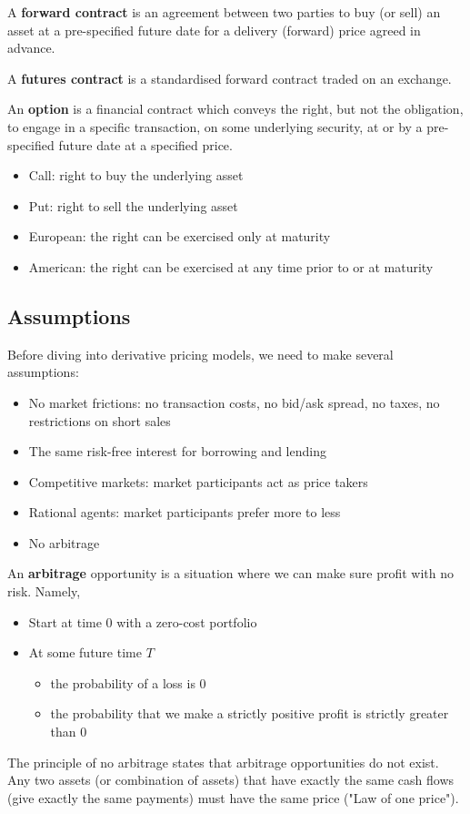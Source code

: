 \documentclass[11pt,a4paper]{book}
\theoremstyle{definition}\newtheorem{definition}{Definition}
\theoremstyle{definition}\newtheorem{fact}{Fact}
\theoremstyle{definition}\newtheorem{remark}{Remark}
\theoremstyle{definition}\newtheorem{ex}{Ex.}
\theoremstyle{definition}\newtheorem{project}{Project}
\theoremstyle{definition}\newtheorem{problem}{Problem}
\theoremstyle{definition}\newtheorem{example}{Example}
\numberwithin{theorem}{section}
\numberwithin{corollary}{chapter}
\numberwithin{assumption}{chapter}
\numberwithin{definition}{chapter}
\numberwithin{prop}{chapter}
\numberwithin{notation}{chapter}
\numberwithin{problem}{chapter}
\numberwithin{example}{chapter}
\numberwithin{fact}{chapter}
\numberwithin{ex}{chapter}
\begin{document}
A \textbf{forward contract} is an agreement between two parties to buy (or sell) an asset at a pre-specified future date for a delivery (forward) price agreed in advance.

A \textbf{futures contract} is a standardised forward contract traded on an exchange.

An \textbf{option} is a financial contract which conveys the right, but not the obligation, to engage in a specific transaction, on some underlying security, at or by a pre-specified future date at a specified price.
\begin{itemize}
\item Call: right to buy the underlying asset
\item Put: right to sell the underlying asset
\item European: the right can be exercised only at maturity
\item American: the right can be exercised at any time prior to or at maturity
\end{itemize}

\subsection{Assumptions}
Before diving into derivative pricing models, we need to make several assumptions:
\begin{itemize}
\item No market frictions: no transaction costs, no bid/ask spread, no taxes, no restrictions on short sales 
\item The same risk-free interest for borrowing and lending
\item Competitive markets: market participants act as price takers
\item Rational agents: market participants prefer more to less
\item No arbitrage
\end{itemize}

An \textbf{arbitrage} opportunity is a situation where we can make sure profit with no risk. Namely,
\begin{itemize}
\item Start at time 0 with a zero-cost portfolio
\item At some future time $T$
\begin{itemize}[label=$\circ$]
\item the probability of a loss is 0
\item the probability that we make a strictly positive profit is strictly greater than 0
\end{itemize}
\end{itemize}
The principle of no arbitrage states that arbitrage opportunities do not exist. Any two assets (or combination of assets) that have exactly the same cash flows (give exactly the same payments) must have the same price ("Law of one price").
\end{document}
